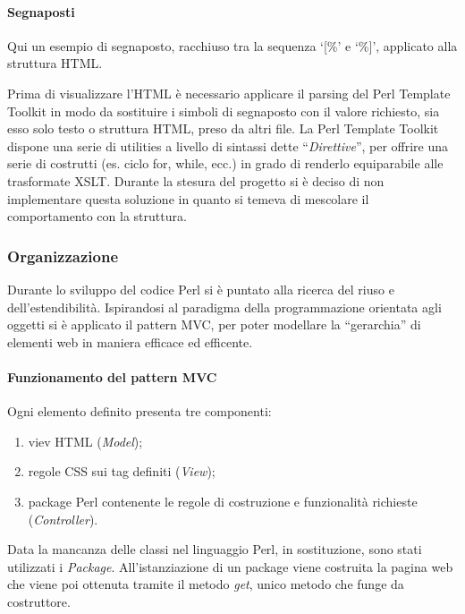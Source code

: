 \paragraph*{Segnaposti} Qui un esempio di segnaposto, racchiuso tra la sequenza `[\%' e `\%]', applicato alla struttura HTML.


Prima di visualizzare l'HTML \`e necessario applicare il parsing del Perl Template Toolkit in modo da sostituire i simboli di segnaposto con il valore richiesto, sia esso solo testo o struttura HTML, preso da altri file.
La Perl Template Toolkit dispone una serie di utilities a livello di sintassi dette ``\textit{Direttive}'', per offrire una serie di costrutti (es. ciclo for, while, ecc.) in grado di renderlo equiparabile alle trasformate XSLT. Durante la stesura del progetto si \`e deciso di non implementare questa soluzione in quanto si temeva di mescolare il comportamento con la struttura.


\subsubsection{Organizzazione}
Durante lo sviluppo del codice Perl si \`e puntato alla ricerca del riuso e dell'estendibilit\`a. Ispirandosi al paradigma della programmazione orientata agli oggetti si \`e applicato il pattern MVC, per poter modellare la ``gerarchia'' di elementi web in maniera efficace ed efficente.

\paragraph*{Funzionamento del pattern MVC}Ogni elemento definito presenta tre componenti:
\begin{enumerate}
    \item viev HTML (\textit{Model});
    \item regole CSS sui tag definiti (\textit{View});
    \item package Perl contenente le regole di costruzione e funzionalit\`a richieste (\textit{Controller}).
\end{enumerate}

Data la mancanza delle classi nel linguaggio Perl, in sostituzione, sono stati utilizzati i \textit{Package}. All'istanziazione di un package viene costruita la pagina web che viene poi ottenuta tramite il metodo \textit{get}, unico metodo che funge da costruttore.

